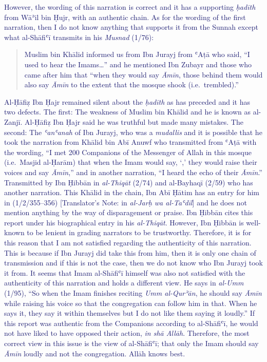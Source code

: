 \textcolor{MidnightBlue}{However, the wording of this narration is correct and it has a
  supporting \emph{ḥadīth} from Wāʾil bin Ḥujr, with an authentic chain. As
  for the wording of the first narration, then I do not know anything that
  supports it from the Sunnah except what al-Shāfiʿī transmits in his
  \emph{Musnad} (1/76):}
  
  \begin{quote}
    \textcolor{MidnightBlue}{Muslim bin Khālid informed us from Ibn Jurayj from ʿAṭā who said, ``I
    used to hear the Imams\ldots{}'' and he mentioned Ibn Zubayr and those
    who came after him that ``when they would say \emph{Āmīn}, those behind
    them would also say \emph{Āmīn} to the extent that the mosque shook
    (i.e.~trembled).''}
  \end{quote}

\textcolor{MidnightBlue}{Al-Ḥāfiẓ Ibn Ḥajr remained silent about the \emph{ḥadīth} as has
  preceded and it has two defects. The first: The weakness of Muslim bin
  Khālid and he is known as al-Zanjī. Al-Ḥāfiẓ Ibn Ḥajr said he was
  truthful but made many mistakes. The second: The \emph{ʿanʿanah} of Ibn
  Jurayj, who was a \emph{mudallis} and it is possible that he took the
  narration from Khālid bin Abī Anuwf who transmitted from ʿAṭā with the
  wording, ``I met 200 Companions of the Messenger of Allah \pbuh in this
  mosque (i.e.~Masjid al-Ḥarām) that when the Imam would say, `\textarabic{},' they would raise their voices and say \emph{Āmīn},'' and in
  another narration, ``I heard the echo of their \emph{Āmīn}.''
  Transmitted by Ibn Ḥibbān in \emph{al-Thiqāt} (2/74) and al-Bayhaqī (2/59)
  who has another narration. This Khālid in the chain, Ibn Abī Ḥātim has
  an entry for him in (1/2/355--356) {[}Translator's Note: in
  \emph{al-Jarḥ wa al-Taʿdīl}{]} and he does not mention anything by the
  way of disparagement or praise. Ibn Ḥibbān cites this report under his
  biographical entry in his \emph{al-Thiqāt}. However, Ibn Ḥibbān is
  well-known to be lenient in grading narrators to be trustworthy.
  Therefore, it is for this reason that I am not satisfied regarding the
  authenticity of this narration. This is because if Ibn Jurayj did take
  this from him, then it is only one chain of transmission and if this is
  not the case, then we do not know who Ibn Jurayj took it from. It seems
  that Imam al-Shāfiʿī himself was also not satisfied with the
  authenticity of this narration and holds a different view. He says in
  \emph{al-Umm} (1/95), ``So when the Imam finishes reciting \emph{Umm
    al-Qurʾān}, he should say \emph{Āmīn} while raising his voice so that
  the congregation can follow him in that. When he says it, they say it
  within themselves but I do not like them saying it loudly.'' If this
  report was authentic from the Companions according to al-Shāfiʿī, he
  would not have liked to have opposed their action, \emph{in shā Allāh}.
  Therefore, the most correct view in this issue is the view of
  al-Shāfiʿī; that only the Imam should say \emph{Āmīn} loudly and not the
  congregation. Allāh knows best.} %

